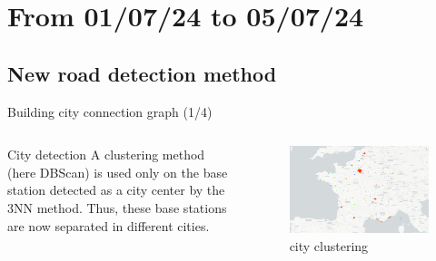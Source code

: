 \smallframetitle

\section{From 01/07/24 to 05/07/24}
\insertsectionframe

\subsection{New road detection method}
\insertsubsectionframe

\begin{frame}{Building city connection graph (1/4)}
    \begin{columns}
        \begin{column}{0.4\textwidth}
            \begin{block}{City detection}
                A clustering method (here DBScan) is used only on the base station detected as a city center by the 3NN method.
                Thus, these base stations are now separated in different cities.
            \end{block}
        \end{column}
        \begin{column}{0.6\textwidth}
            \begin{figure}
                \includegraphics[width=0.5\paperwidth]{images/road_detection/city_clustering.png}
                \caption{city clustering}
            \end{figure}
        \end{column}
    \end{columns}        
\end{frame}

